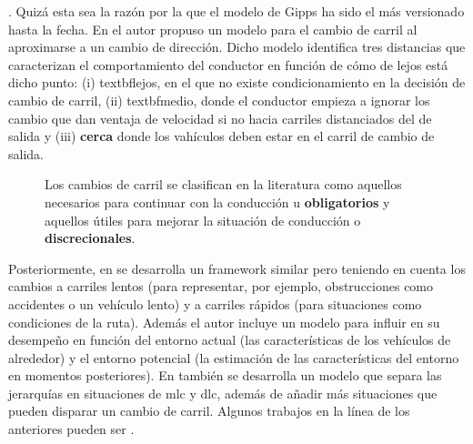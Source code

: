 . Quizá esta sea la razón por la que el modelo de Gipps ha sido el más versionado hasta la fecha. En \cite{Gipps1986} el autor propuso un modelo para el cambio de carril al aproximarse a un cambio de dirección. Dicho modelo identifica tres distancias que caracterizan el comportamiento del conductor en función de cómo de lejos está dicho punto: (i) textbf{lejos}, en el que no existe condicionamiento en la decisión de cambio de carril, (ii) textbf{medio}, donde el conductor empieza a ignorar los cambio que dan ventaja de velocidad si no hacia carriles distanciados del de salida y (iii) \textbf{cerca} donde los vahículos deben estar en el carril de cambio de salida.

\begin{figure}
	\caption{Los cambios de carril se clasifican en la literatura como aquellos necesarios para continuar con la conducción u \textbf{obligatorios} y aquellos útiles para mejorar la situación de conducción o \textbf{discrecionales}.}
	\label{fig:lane-change-mandatory-vs-discretional}
\end{figure}

Posteriormente, en \cite{wiedemann1992microscopic} se desarrolla un framework similar pero teniendo en cuenta los cambios a carriles lentos (para representar, por ejemplo, obstrucciones como accidentes o un vehículo lento) y a carriles rápidos (para situaciones como condiciones de la ruta). Además el autor incluye un modelo para influir en su desempeño en función del entorno actual (las características de los vehículos de alrededor) y el entorno potencial (la estimación de las características del entorno en momentos posteriores). En \cite{Hidas2002} también se desarrolla un modelo que separa las jerarquías en situaciones de \gls{mlc} y \gls{dlc}, además de añadir más situaciones que pueden disparar un cambio de carril. Algunos trabajos en la línea de los anteriores pueden ser \cite{Yang1996, Halati1997, Ahmed1999}.

